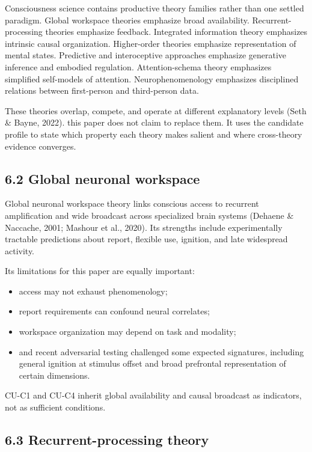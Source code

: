 \documentclass[
  11pt,
]{article}
\providecommand{\tightlist}{%
  \setlength{\itemsep}{0pt}\setlength{\parskip}{0pt}}
\begin{document}
Consciousness science contains productive theory families rather than
one settled paradigm. Global workspace theories emphasize broad
availability. Recurrent-processing theories emphasize feedback.
Integrated information theory emphasizes intrinsic causal organization.
Higher-order theories emphasize representation of mental states.
Predictive and interoceptive approaches emphasize generative inference
and embodied regulation. Attention-schema theory emphasizes simplified
self-models of attention. Neurophenomenology emphasizes disciplined
relations between first-person and third-person data.

These theories overlap, compete, and operate at different explanatory
levels (Seth \& Bayne, 2022). this paper does not claim to replace them.
It uses the candidate profile to state which property each theory makes
salient and where cross-theory evidence converges.

\subsection{6.2 Global neuronal
workspace}\label{global-neuronal-workspace}

Global neuronal workspace theory links conscious access to recurrent
amplification and wide broadcast across specialized brain systems
(Dehaene \& Naccache, 2001; Mashour et al., 2020). Its strengths include
experimentally tractable predictions about report, flexible use,
ignition, and late widespread activity.

Its limitations for this paper are equally important:

\begin{itemize}
\tightlist
\item
  access may not exhaust phenomenology;
\item
  report requirements can confound neural correlates;
\item
  workspace organization may depend on task and modality;
\item
  and recent adversarial testing challenged some expected signatures,
  including general ignition at stimulus offset and broad prefrontal
  representation of certain dimensions.
\end{itemize}

CU-C1 and CU-C4 inherit global availability and causal broadcast as
indicators, not as sufficient conditions.

\subsection{6.3 Recurrent-processing
theory}\label{recurrent-processing-theory}
\end{document}
